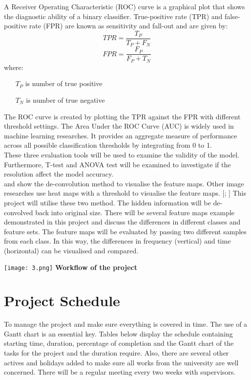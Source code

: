 \documentclass{article}
\begin{document}
    A Receiver Operating Characteristic (ROC) curve is a graphical plot that shows the diagnostic ability of a binary classifier. True-positive rate (TPR) and false-positive rate (FPR) are known as sensitivity and fall-out and are given by:
    \[
        TPR = \frac{T_P}{T_P+F_N}
    \]
    \[
        FPR = \frac{F_P}{F_P+T_N}    
    \]
    where:
    \begin{itemize}
        \item[$T_P$] is number of true positive
        \item[$T_N$] is number of true negative
    \end{itemize}
    The ROC curve is created by plotting the TPR against the FPR with different threshold settings. The Area Under the ROC Curve (AUC) is widely used in machine learning researches. It provides an aggregate measure of performance across all possible classification thresholds by integrating from 0 to 1. \\
    These three evaluation tools will be used to examine the validity of the model. Furthermore, T-test and ANOVA test will be examined to investigate if the resolution affect the model accuracy. \\
    \cite{choi2015auralisation} and \cite{choi2016explaining} show the de-convolution method to visualise the feature maps. Other image researches use heat maps with a threshold to visualise the feature maps. {[\cite{chen2017masquer}; \cite{zeiler2014visualizing}]} This project will utilise these two method. The hidden information will be de-convolved back into original size. There will be several feature maps example demonstrated in this project and discuss the differences in different classes and feature sets. The feature maps will be evaluated by passing two different samples from each class. In this way, the differences in frequency (vertical) and time (horizontal) can be visualised and compared.
    \hss
    \begin{center}
    \hspace*{-.5cm} 
        \texttt{[image: 3.png]}
        \textbf{\large{Workflow of the project}}
    \end{center}
    

\clearpage
\section{Project Schedule}
To manage the project and make sure everything is covered in time. The use of a Gantt chart is an essential key. Tables below display the schedule containing starting time, duration, percentage of completion and the Gantt chart of the tasks for the project and the duration require. Also, there are several other actives and holidays added to make sure all works from the university are well concerned. There will be a regular meeting every two weeks with supervisors.\\
\end{document}
